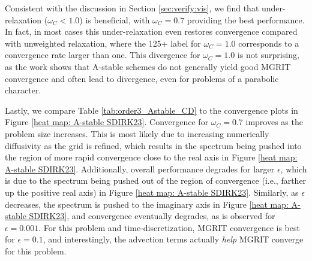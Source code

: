 \documentclass[VANCOUVER,STIX1COL]{WileyNJD-v2}
\makeatletter
\newcommand{\bs}[1]{\textcolor{magenta}{[BS\@: #1]}}
\makeatother
\begin{document}
Consistent with the discussion in Section \ref{sec:verify:vis}, we find that
under-relaxation ($\omega_C < 1.0$) is beneficial, with $\omega_C = 0.7$
providing the best performance.  In fact, in most cases this under-relaxation even restores
convergence compared with unweighted relaxation, where the 125+ label for
$\omega_C = 1.0$ corresponds to a convergence rate larger than one. 
This divergence for $\omega_C = 1.0$ is not surprising, as the work \cite{FrSo2020}
shows that A-stable schemes do not generally yield good MGRIT convergence and
often lead to divergence, even for problems of a parabolic character.

Lastly, we compare Table \ref{tab:order3_Astable_CD} to the convergence plots in Figure \ref{heat map: A-stable SDIRK23}. Convergence for $\omega_C = 0.7$
improves as the problem size increases.  This is most likely due to increasing numerically diffusivity
as the grid is refined, which results in the 
spectrum being pushed into the region of more rapid convergence close to the real axis 
in Figure \ref{heat map: A-stable SDIRK23}.  Additionally, overall performance degrades for larger
$\epsilon$, which is due to the spectrum being pushed out of the region of convergence (i.e., farther up the positive real axis) in Figure \ref{heat map: A-stable SDIRK23}.  
Similarly, as $\epsilon$ decreases, the spectrum is 
pushed to the imaginary axis in Figure \ref{heat map: A-stable SDIRK23}, and convergence eventually degrades, as
is observed for $\epsilon=0.001$.  
For this problem and time-discretization, MGRIT convergence is best for $\epsilon = 0.1$, and interestingly, the advection terms actually \emph{help} MGRIT converge for this problem.
\end{document}
